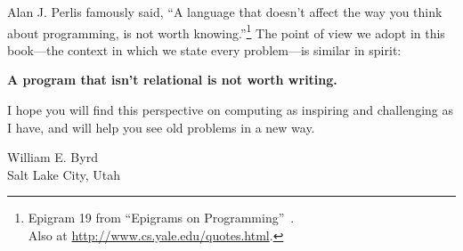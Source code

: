 Alan J. Perlis famously said, ``A language that doesn't affect the way you think about programming, is not worth knowing.''\footnote{Epigram 19 from ``Epigrams on Programming''~\cite{Perlis:1982:SFE:947955.1083808}.\\Also at \url{http://www.cs.yale.edu/quotes.html}.}
%
The point of view we adopt in this book---the context in which we
state every problem---is similar in spirit:

\vspace{-5mm}

\large
\begin{center}
{\bf A program that isn't relational is not worth writing.}
\end{center}
\normalsize

\vspace{-5mm}

I hope you will find this perspective on computing as inspiring and
challenging as I have, and will help you see old problems in a new way.


\wspace

\noindent
William E. Byrd\\
\noindent
Salt Lake City, Utah\\
\noindent
\monthyear
